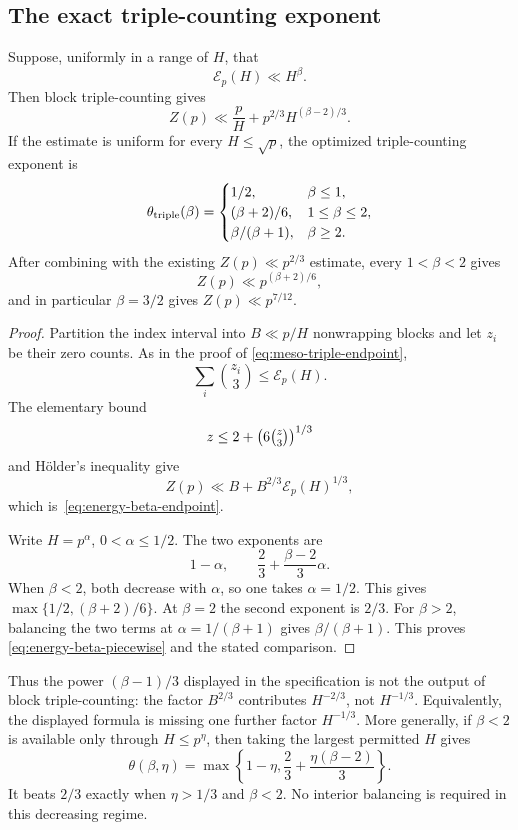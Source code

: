\subsection{The exact triple-counting exponent}

\begin{proposition}
\label{prop:energy-beta-optimization}
Suppose, uniformly in a range of $H$, that
\[
 \mathcal E_p(H)\ll H^\beta.
\]
Then block triple-counting gives
\begin{equation}\label{eq:energy-beta-endpoint}
 Z(p)\ll\frac pH+p^{2/3}H^{(\beta-2)/3}.
\end{equation}
If the estimate is uniform for every $H\leq\sqrt p$, the optimized
triple-counting exponent is
\begin{equation}\label{eq:energy-beta-piecewise}
 \theta_{\rm triple}(\beta)=
 \begin{cases}
  1/2,&\beta\leq1,\\
  (\beta+2)/6,&1\leq\beta\leq2,\\
  \beta/(\beta+1),&\beta\geq2.
 \end{cases}
\end{equation}
After combining with the existing $Z(p)\ll p^{2/3}$ estimate, every
$1<\beta<2$ gives
\[
 Z(p)\ll p^{(\beta+2)/6},
\]
and in particular $\beta=3/2$ gives $Z(p)\ll p^{7/12}$.
\end{proposition}

\begin{proof}
Partition the index interval into $B\ll p/H$ nonwrapping blocks and let
$z_i$ be their zero counts.  As in the proof of
\eqref{eq:meso-triple-endpoint},
\[
 \sum_i\binom{z_i}{3}\leq\mathcal E_p(H).
\]
The elementary bound
\[
 z\leq2+\bigl(6\tbinom z3\bigr)^{1/3}
\]
and H\"older's inequality give
\[
 Z(p)\ll B+B^{2/3}\mathcal E_p(H)^{1/3},
\]
which is~\eqref{eq:energy-beta-endpoint}.

Write $H=p^\alpha$, $0<\alpha\leq1/2$.  The two exponents are
\[
 1-\alpha,
 \qquad
 \frac23+\frac{\beta-2}{3}\alpha.
\]
When $\beta<2$, both decrease with $\alpha$, so one takes
$\alpha=1/2$.  This gives
$\max\{1/2,(\beta+2)/6\}$.  At $\beta=2$ the second exponent is $2/3$.
For $\beta>2$, balancing the two terms at
$\alpha=1/(\beta+1)$ gives $\beta/(\beta+1)$.  This proves
\eqref{eq:energy-beta-piecewise} and the stated comparison.
\end{proof}

Thus the power $(\beta-1)/3$ displayed in the specification is not the
output of block triple-counting: the factor $B^{2/3}$ contributes
$H^{-2/3}$, not $H^{-1/3}$.  Equivalently, the displayed formula is
missing one further factor $H^{-1/3}$.  More generally, if
$\beta<2$ is available only through $H\leq p^\eta$, then taking the
largest permitted $H$ gives
\begin{equation}\label{eq:energy-range-beta}
 \theta(\beta,\eta)=
 \max\left\{1-\eta,
 \frac23+\frac{\eta(\beta-2)}3\right\}.
\end{equation}
It beats $2/3$ exactly when $\eta>1/3$ and $\beta<2$.  No interior
balancing is required in this decreasing regime.

